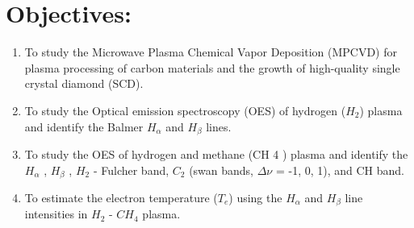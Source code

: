 \documentclass[]{report}[12 pt]
\begin{document}
	
	\section*{Objectives:}
	\begin{enumerate}
		\item To study the Microwave Plasma Chemical Vapor Deposition (MPCVD) for plasma
		processing of carbon materials and the growth of high-quality single crystal diamond
		(SCD).
		\item To study the Optical emission spectroscopy (OES) of hydrogen ($H_2$) plasma and
		identify the Balmer $H_\alpha$ and $H_\beta$ lines.
		\item To study the OES of hydrogen and methane (CH 4 ) plasma and identify the $H_\alpha$ , $H_\beta$ , $H_2$  - Fulcher band, $C_2$ (swan bands, $\Delta \nu$ = -1, 0, 1), and CH band.
		\item  To estimate the electron temperature ($T_e$) using the $H_\alpha$ and $H_\beta$ line intensities in $H_2$ - $CH_4$
		plasma.
	\end{enumerate}
\end{document}
